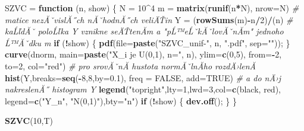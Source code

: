 \documentclass[
]{article}
\newenvironment{Shaded}{\begin{snugshade}}{\end{snugshade}}
\newcommand{\AttributeTok}[1]{\textcolor[rgb]{0.13,0.29,0.53}{#1}}
\newcommand{\CommentTok}[1]{\textcolor[rgb]{0.56,0.35,0.01}{\textit{#1}}}
\newcommand{\ConstantTok}[1]{\textcolor[rgb]{0.56,0.35,0.01}{#1}}
\newcommand{\ControlFlowTok}[1]{\textcolor[rgb]{0.13,0.29,0.53}{\textbf{#1}}}
\newcommand{\DecValTok}[1]{\textcolor[rgb]{0.00,0.00,0.81}{#1}}
\newcommand{\FloatTok}[1]{\textcolor[rgb]{0.00,0.00,0.81}{#1}}
\newcommand{\FunctionTok}[1]{\textcolor[rgb]{0.13,0.29,0.53}{\textbf{#1}}}
\newcommand{\NormalTok}[1]{#1}
\newcommand{\OtherTok}[1]{\textcolor[rgb]{0.56,0.35,0.01}{#1}}
\newcommand{\SpecialCharTok}[1]{\textcolor[rgb]{0.81,0.36,0.00}{\textbf{#1}}}
\newcommand{\StringTok}[1]{\textcolor[rgb]{0.31,0.60,0.02}{#1}}
\begin{document}
\begin{Shaded}
\begin{Highlighting}[]
\NormalTok{SZVC }\OtherTok{=} \ControlFlowTok{function}\NormalTok{ (n, show) \{}
\NormalTok{  N }\OtherTok{=} \DecValTok{10}\SpecialCharTok{\^{}}\DecValTok{4}
\NormalTok{  m }\OtherTok{=} \FunctionTok{matrix}\NormalTok{(}\FunctionTok{runif}\NormalTok{(n}\SpecialCharTok{*}\NormalTok{N), }\AttributeTok{nrow=}\NormalTok{N)     }\CommentTok{\# matice nezĂˇvislĂ˝ch nĂˇhodnĂ˝ch veliÄŤin}
\NormalTok{  Y }\OtherTok{=}\NormalTok{ (}\FunctionTok{rowSums}\NormalTok{(m)}\SpecialCharTok{{-}}\NormalTok{n}\SpecialCharTok{/}\DecValTok{2}\NormalTok{)}\SpecialCharTok{/}\NormalTok{(n) }\CommentTok{\# kaĹľdĂˇ poloĹľka Y vznikne seÄŤtenĂ­m a "pĹ™eĹˇkĂˇlovĂˇnĂ­m" jednoho Ĺ™Ăˇdku m}
  \ControlFlowTok{if}\NormalTok{ (}\SpecialCharTok{!}\NormalTok{show) \{ }\FunctionTok{pdf}\NormalTok{(}\AttributeTok{file=}\FunctionTok{paste}\NormalTok{(}\StringTok{"SZVC\_unif{-}"}\NormalTok{, n, }\StringTok{".pdf"}\NormalTok{, }\AttributeTok{sep=}\StringTok{""}\NormalTok{)); \}}
  \FunctionTok{curve}\NormalTok{(dnorm, }\AttributeTok{main=}\FunctionTok{paste}\NormalTok{(}\StringTok{"X\_i je U(0,1), n="}\NormalTok{, n), }\AttributeTok{ylim=}\FunctionTok{c}\NormalTok{(}\DecValTok{0}\NormalTok{,}\DecValTok{5}\NormalTok{), }\AttributeTok{from=}\SpecialCharTok{{-}}\DecValTok{2}\NormalTok{, }\AttributeTok{to=}\DecValTok{2}\NormalTok{, }\AttributeTok{col=}\StringTok{"red"}\NormalTok{)        }\CommentTok{\# pro srovĂˇnĂ­ hustota normĂˇlnĂ­ho rozdÄ›lenĂ­ }
  \FunctionTok{hist}\NormalTok{(Y,}\AttributeTok{breaks=}\FunctionTok{seq}\NormalTok{(}\SpecialCharTok{{-}}\DecValTok{8}\NormalTok{,}\DecValTok{8}\NormalTok{,}\AttributeTok{by=}\FloatTok{0.1}\NormalTok{), }\AttributeTok{freq =} \ConstantTok{FALSE}\NormalTok{, }\AttributeTok{add=}\ConstantTok{TRUE}\NormalTok{) }\CommentTok{\# a do nÄ›j nakreslenĂ˝ histogram Y}
  \FunctionTok{legend}\NormalTok{(}\StringTok{"topright"}\NormalTok{,}\AttributeTok{lty=}\DecValTok{1}\NormalTok{,}\AttributeTok{lwd=}\DecValTok{3}\NormalTok{,}\AttributeTok{col=}\FunctionTok{c}\NormalTok{(}\StringTok{\textquotesingle{}black\textquotesingle{}}\NormalTok{, }\StringTok{\textquotesingle{}red\textquotesingle{}}\NormalTok{),}
       \AttributeTok{legend=}\FunctionTok{c}\NormalTok{(}\StringTok{"Y\_n"}\NormalTok{, }\StringTok{"N(0,1)"}\NormalTok{),}\AttributeTok{bty=}\StringTok{"n"}\NormalTok{)    }
  \ControlFlowTok{if}\NormalTok{ (}\SpecialCharTok{!}\NormalTok{show) \{ }\FunctionTok{dev.off}\NormalTok{(); \}}
\NormalTok{\}}

\FunctionTok{SZVC}\NormalTok{(}\DecValTok{10}\NormalTok{,T)}
\end{Highlighting}
\end{Shaded}
\end{document}

